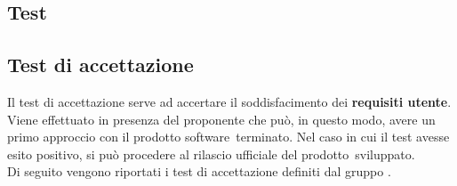 \documentclass[../PianoDiQualifica.tex]{subfiles}
\begin{document}
\begin{appendices}

\section{Test}
	\subsection{Test di accettazione}
	Il test di accettazione serve ad accertare il soddisfacimento dei \textbf{requisiti utente}. Viene effettuato in presenza del proponente che può, in questo modo, avere un primo approccio con il prodotto software\g\ terminato. Nel caso in cui il test avesse esito positivo, si può procedere al rilascio ufficiale del prodotto\g\ 
sviluppato.\\
	Di seguito vengono riportati i test di accettazione definiti dal gruppo \leaf.
	

\end{appendices}
\end{document}
